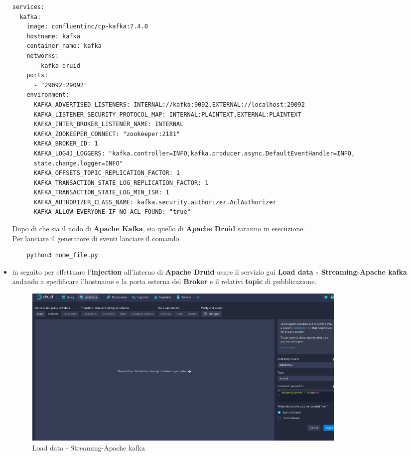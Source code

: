 \documentclass{article}
\begin{document}
\begin{itemize}
\begin{lstlisting}[yaml]
services:
  kafka:
    image: confluentinc/cp-kafka:7.4.0
    hostname: kafka
    container_name: kafka
    networks:
      - kafka-druid
    ports:
      - "29092:29092"
    environment:
      KAFKA_ADVERTISED_LISTENERS: INTERNAL://kafka:9092,EXTERNAL://localhost:29092
      KAFKA_LISTENER_SECURITY_PROTOCOL_MAP: INTERNAL:PLAINTEXT,EXTERNAL:PLAINTEXT
      KAFKA_INTER_BROKER_LISTENER_NAME: INTERNAL
      KAFKA_ZOOKEEPER_CONNECT: "zookeeper:2181"
      KAFKA_BROKER_ID: 1
      KAFKA_LOG4J_LOGGERS: "kafka.controller=INFO,kafka.producer.async.DefaultEventHandler=INFO,
      state.change.logger=INFO"
      KAFKA_OFFSETS_TOPIC_REPLICATION_FACTOR: 1
      KAFKA_TRANSACTION_STATE_LOG_REPLICATION_FACTOR: 1
      KAFKA_TRANSACTION_STATE_LOG_MIN_ISR: 1
      KAFKA_AUTHORIZER_CLASS_NAME: kafka.security.authorizer.AclAuthorizer
      KAFKA_ALLOW_EVERYONE_IF_NO_ACL_FOUND: "true"
\end{lstlisting}
Dopo di che sia il nodo di \textbf{Apache Kafka}, sia quello di \textbf{Apache Druid} saranno in esecuzione. \\
Per lanciare il generatore di eventi lanciare il comando
\begin{lstlisting}
    python3 nome_file.py
\end{lstlisting}
\item in seguito per effettuare l'\textbf{injection} all'interno di \textbf{Apache Druid} usare il servizio gui \textbf{Load data - Streaming-Apache kafka} andando a spedificare  l'hostname e la porta esterna del \textbf{Broker} e il relativi \textbf{topic} di pubblicazione.
\begin{figure}[H]
    \centering
    \includegraphics[width=0.8\textwidth]{images/load_data.png}
    \caption{Load data - Streaming-Apache kafka}
\end{figure}
\end{itemize}
\end{document}
